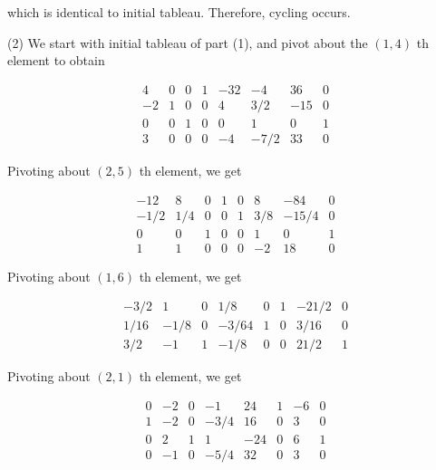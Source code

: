 which is identical to initial tableau. Therefore, cycling occurs.

(2) We start with initial tableau of part (1), and pivot about the \((1,4)\) th element to obtain

\begin{equation*}
	\begin{array}{cccccccc}
		4 & 0 & 0 & 1 & -32 & -4 & 36 & 0 \\
		-2 & 1 & 0 & 0 & 4 & 3 / 2 & -15 & 0 \\
		0 & 0 & 1 & 0 & 0 & 1 & 0 & 1 \\
		3 & 0 & 0 & 0 & -4 & -7 / 2 & 33 & 0
	\end{array}
\end{equation*}

Pivoting about \((2,5)\) th element, we get

\begin{equation*}
	\begin{array}{cccccccc}
		-12 & 8 & 0 & 1 & 0 & 8 & -84 & 0 \\
		-1 / 2 & 1 / 4 & 0 & 0 & 1 & 3 / 8 & -15 / 4 & 0 \\
		0 & 0 & 1 & 0 & 0 & 1 & 0 & 1 \\
		1 & 1 & 0 & 0 & 0 & -2 & 18 & 0
	\end{array}
\end{equation*}

Pivoting about \((1,6)\) th element, we get

\begin{equation*}
	\begin{array}{cccccccc}
		-3 / 2 & 1 & 0 & 1 / 8 & 0 & 1 & -21 / 2 & 0 \\
		1 / 16 & -1 / 8 & 0 & -3 / 64 & 1 & 0 & 3 / 16 & 0 \\
		3 / 2 & -1 & 1 & -1 / 8 & 0 & 0 & 21 / 2 & 1
	\end{array}
\end{equation*}

Pivoting about \((2,1)\) th element, we get

\begin{equation*}
	\begin{array}{cccccccc}
		0 & -2 & 0 & -1 & 24 & 1 & -6 & 0 \\
		1 & -2 & 0 & -3 / 4 & 16 & 0 & 3 & 0 \\
		0 & 2 & 1 & 1 & -24 & 0 & 6 & 1 \\
		0 & -1 & 0 & -5 / 4 & 32 & 0 & 3 & 0
	\end{array}
\end{equation*}

